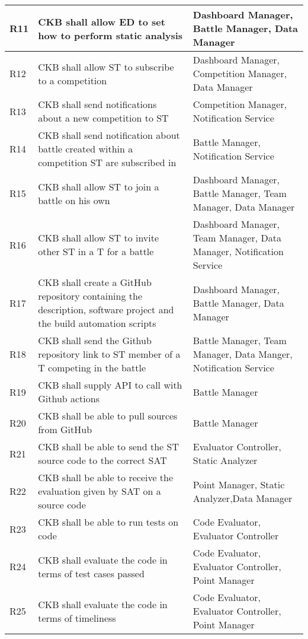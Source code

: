 \begin{center}
\begin{longtable}{|p{0.05\linewidth}|p{0.55\linewidth}|p{0.4\linewidth}|}
        \hline
        R11 & CKB shall allow ED to set how to perform static analysis &  Dashboard Manager, Battle Manager, Data Manager\\
        \hline
        R12 & CKB shall allow ST to subscribe to a competition &  Dashboard Manager, Competition Manager, Data Manager\\
        \hline
        R13 & CKB shall send notifications about a new competition to ST & Competition Manager, Notification Service \\
        \hline
        R14 & CKB shall send notification about battle created within a competition ST are subscribed in & Battle Manager, Notification Service \\
        \hline
        R15 & CKB shall allow ST to join a battle on his own &  Dashboard Manager, Battle Manager, Team Manager, Data Manager\\
        \hline
        R16 & CKB shall allow ST to invite other ST in a T for a battle &  Dashboard Manager, Team Manager, Data Manager, Notification Service \\
        \hline
        R17 & CKB shall create a GitHub repository containing the description, software project and the build automation scripts & Dashboard Manager, Battle Manager, Data Manager\\
        \hline
        R18 & CKB shall send the Github repository link to ST member of a T competing in the battle & Battle Manager, Team Manager, Data Manger, Notification Service\\
        \hline
        R19 & CKB shall supply API to call with Github actions & Battle Manager \\
        \hline
        R20 & CKB shall be able to pull sources from GitHub & Battle Manager \\
        \hline
        R21 & CKB shall be able to send the ST source code to the correct SAT  & Evaluator Controller, Static Analyzer\\
        \hline
        R22 & CKB shall be able to receive the evaluation given by SAT on a source code & Point Manager, Static Analyzer,Data Manager\\
        \hline
        R23 & CKB shall be able to run tests on code & Code Evaluator, Evaluator Controller \\
        \hline
        R24 & CKB shall evaluate the code in terms of test cases passed & Code Evaluator, Evaluator Controller, Point Manager\\
        \hline
        R25 & CKB shall evaluate the code in terms of timeliness & Code Evaluator, Evaluator Controller, Point Manager\\

\end{longtable}
\end{center}
